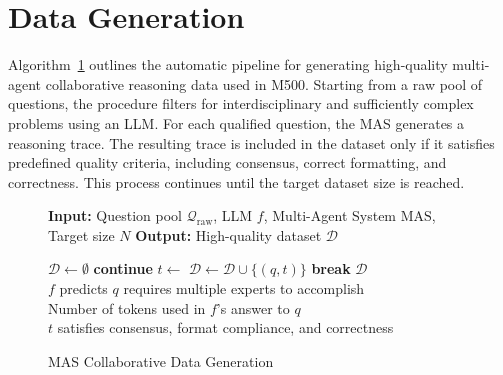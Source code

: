 
\section{Data Generation}
Algorithm~\ref{algo:data_generation} outlines the automatic pipeline for generating high-quality multi-agent collaborative reasoning data used in M500. Starting from a raw pool of questions, the procedure filters for interdisciplinary and sufficiently complex problems using an LLM. For each qualified question, the MAS generates a reasoning trace. The resulting trace is included in the dataset only if it satisfies predefined quality criteria, including consensus, correct formatting, and correctness. This process continues until the target dataset size is reached.

\begin{figure}[h]
\begin{minipage}{\linewidth}
\begin{algorithm}[H]
\small
\caption{MAS Collaborative Data Generation}
\label{algo:data_generation}
\begin{algorithmic}[1]
\State \textbf{Input:} Question pool $\mathcal{Q}_{\text{raw}}$, LLM $f$, Multi-Agent System $\text{MAS}$, Target size $N$
\State \textbf{Output:} High-quality dataset $\mathcal{D}$

    \State $\mathcal{D} \gets \emptyset$
            \State \textbf{continue}
        \EndIf
        \State $t \gets$ 
            \State $\mathcal{D} \gets \mathcal{D} \cup \{(q, t)\}$
        \EndIf
            \State \textbf{break}
        \EndIf
    \EndFor
    \State \Return $\mathcal{D}$
\EndProcedure
\\
    \State \Return $f$ predicts $q$ requires multiple experts to accomplish
\EndFunction
\\
    \State \Return Number of tokens used in $f$'s answer to $q$
\EndFunction
\\
    \State \Return $t$ satisfies consensus, format compliance, and correctness
\EndFunction
\end{algorithmic}
\end{algorithm}
\end{minipage}
\end{figure}

